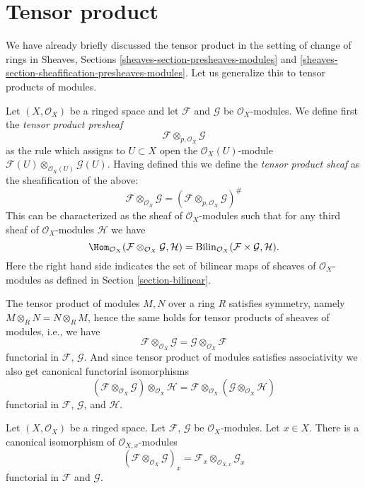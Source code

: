 \section{Tensor product}
\label{section-tensor-product}

\noindent
We have already briefly discussed the tensor product in the setting
of change of rings in Sheaves, Sections
\ref{sheaves-section-presheaves-modules} and
\ref{sheaves-section-sheafification-presheaves-modules}.
Let us generalize this to tensor products of modules.

\medskip\noindent
Let $(X, \mathcal{O}_X)$ be a ringed space and let
$\mathcal{F}$ and $\mathcal{G}$ be $\mathcal{O}_X$-modules.
We define first the {\it tensor product presheaf}
$$
\mathcal{F} \otimes_{p, \mathcal{O}_X} \mathcal{G}
$$
as the rule which assigns to $U \subset X$ open the
$\mathcal{O}_X(U)$-module
$\mathcal{F}(U) \otimes_{\mathcal{O}_X(U)} \mathcal{G}(U)$.
Having defined this we define the {\it tensor product sheaf}
as the sheafification of the above:
$$
\mathcal{F} \otimes_{\mathcal{O}_X} \mathcal{G}
=
(\mathcal{F} \otimes_{p, \mathcal{O}_X} \mathcal{G})^\#
$$
This can be characterized as the sheaf of
$\mathcal{O}_X$-modules such that for any third
sheaf of $\mathcal{O}_X$-modules $\mathcal{H}$
we have
$$
\Hom_{\mathcal{O}_X}
(\mathcal{F} \otimes_{\mathcal{O}_X} \mathcal{G}, \mathcal{H})
=
\text{Bilin}_{\mathcal{O}_X}(\mathcal{F} \times \mathcal{G}, \mathcal{H}).
$$
Here the right hand side indicates the set of bilinear maps of sheaves
of $\mathcal{O}_X$-modules as defined in Section \ref{section-bilinear}.

\medskip\noindent
The tensor product of modules $M, N$ over a ring $R$ satisfies symmetry,
namely $M \otimes_R N = N \otimes_R M$, hence the same holds for
tensor products of sheaves of modules, i.e., we have
$$
\mathcal{F} \otimes_{\mathcal{O}_X} \mathcal{G}
=
\mathcal{G} \otimes_{\mathcal{O}_X} \mathcal{F}
$$
functorial in $\mathcal{F}$, $\mathcal{G}$.
And since tensor product of modules satisfies associativity we
also get canonical functorial isomorphisms
$$
(\mathcal{F} \otimes_{\mathcal{O}_X} \mathcal{G})
\otimes_{\mathcal{O}_X} \mathcal{H}
=
\mathcal{F} \otimes_{\mathcal{O}_X}
(\mathcal{G} \otimes_{\mathcal{O}_X} \mathcal{H})
$$
functorial in $\mathcal{F}$, $\mathcal{G}$, and $\mathcal{H}$.

\begin{lemma}
\label{lemma-stalk-tensor-product}
Let $(X, \mathcal{O}_X)$ be a ringed space.
Let $\mathcal{F}$, $\mathcal{G}$ be $\mathcal{O}_X$-modules.
Let $x \in X$. There is a canonical isomorphism
of $\mathcal{O}_{X, x}$-modules
$$
(\mathcal{F} \otimes_{\mathcal{O}_X} \mathcal{G})_x
=
\mathcal{F}_x \otimes_{\mathcal{O}_{X, x}} \mathcal{G}_x
$$
functorial in $\mathcal{F}$ and $\mathcal{G}$.
\end{lemma}

